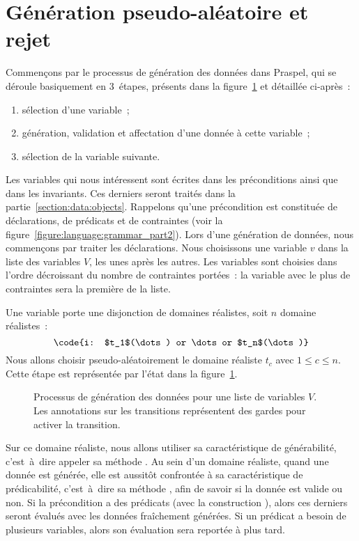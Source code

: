 \section{Génération pseudo-aléatoire et rejet}
\label{section:data:random}

Commençons par le processus de génération des données dans Praspel, qui se
déroule basiquement en 3~étapes, présents dans la
figure~\ref{figure:data:process} et détaillée ci-après~:

\begin{enumerate}

\item sélection d'une variable~;

\item génération, validation et affectation d'une donnée à cette variable~;

\item sélection de la variable suivante.

\end{enumerate}

Les variables qui nous intéressent sont écrites dans les préconditions ainsi que
dans les invariants. Ces derniers seront traités dans la
partie~\ref{section:data:objects}. Rappelons qu'une précondition est constituée
de déclarations, de prédicats et de contraintes (voir la
figure~\ref{figure:language:grammar_part2}). Lors d'une génération de données,
nous commençons par traiter les déclarations. Nous choisissons une variable $v$
dans la liste des variables $V$, les unes après les autres. Les variables sont
choisies dans l'ordre décroissant du nombre de contraintes portées~: la variable
avec le plus de contraintes sera la première de la liste.

Une variable porte une disjonction de domaines réalistes, soit $n$ domaine
réalistes~:
%
$$\code{i: $t_1$(\dots) or \dots or $t_n$(\dots)}$$
%
Nous allons choisir pseudo-aléatoirement le domaine réaliste $t_c$ avec $1 \leq
c \leq n$. Cette étape est représentée par l'état  dans la
figure~\ref{figure:data:process}.
%
\begin{figure}


\caption{\label{figure:data:process} Processus de génération des données pour
une liste de variables $V$. Les annotations sur les transitions représentent des
gardes pour activer la transition.}

\end{figure}
%
Sur ce domaine réaliste, nous allons utiliser sa caractéristique de
générabilité, c'est~à~dire appeler sa méthode . Au sein d'un
domaine réaliste, quand une donnée est générée, elle est aussitôt confrontée à
sa caractéristique de prédicabilité, c'est~à~dire sa méthode ,
afin de savoir si la donnée est valide ou non. Si la précondition a des
prédicats (avec la construction ), alors ces derniers seront évalués
avec les données fraîchement générées. Si un prédicat a besoin de plusieurs
variables, alors son évaluation sera reportée à plus tard.

